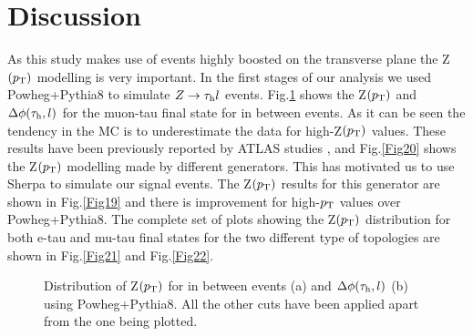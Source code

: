 \section{Discussion}
As this study makes use of events highly boosted on the transverse plane the Z$(p_\text{T})$ modelling is very important. In the first stages of our analysis we used Powheg+Pythia8 to simulate $Z\to\tau_\text{h} l$ events. Fig.\ref{Fig23} shows the Z$(p_\text{T})$ and $\Delta\phi(\tau_\text{h},l)$ for the muon-tau final state for in between events. As it can be seen the tendency in the MC is to underestimate the data for high-Z$(p_\text{T})$ values. These results have been previously reported by ATLAS studies \cite{Aad:2019wmn}, and Fig.\ref{Fig20} shows the Z$(p_\text{T})$ modelling made by different generators. This has motivated us to use Sherpa to simulate our signal events. The Z$(p_\text{T})$ results for this generator are shown in Fig.\ref{Fig19} and there is improvement for high-$p_\text{T}$ values over Powheg+Pythia8. The complete set of plots showing the Z$(p_\text{T})$ distribution for both e-tau and mu-tau final states for the two different type of topologies are shown in Fig.\ref{Fig21} and Fig.\ref{Fig22}.
\begin{figure}[ht]
	\centering
	\hfill
	\caption{Distribution of Z$(p_\text{T})$ for in between events (a) and $\Delta\phi(\tau_\text{h},l)$ (b) using Powheg+Pythia8. All the other cuts have been applied apart from the one being plotted.}
	\label{Fig23}
\end{figure}
